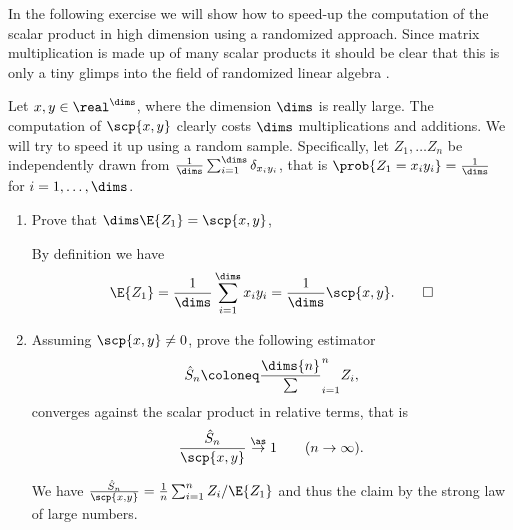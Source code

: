 In the following exercise we will show how to speed-up the computation of the
scalar product in high dimension using a randomized approach.
Since matrix multiplication is made up of many scalar products it should be
clear that this is only a tiny glimps into the field of randomized
linear algebra \citep[e.g.][]{murrayRandomizedNumericalLinear2023}.

\begin{exercise}
    Let \(x,y \in \real^\dims\), where the dimension \(\dims\) is really large.
    The computation of \(\scp{x,y}\) clearly costs \(\dims\) multiplications and
    additions. We will try to speed it up using a random sample.
    Specifically, let \(Z_1, \ldots Z_n\) be independently drawn from
    \(\frac1\dims\sum_{i=1}^\dims \delta_{x_iy_i}\), that is
    \(\prob{Z_1 = x_iy_i} = \frac1\dims\) for \(i=1, \ldots, \dims\).
    \begin{enumerate}[label=(\alph*), noitemsep]
        \item Prove that \(\dims \E{Z_1} = \scp{x,y}\),
        \begin{solution}
            By definition we have
            \[
                \E{Z_1} = \frac1\dims\sum_{i=1}^\dims  x_i y_i = \frac1\dims \scp{x,y}.
                \qedhere
            \]            
        \end{solution}

        \item Assuming \(\scp{x,y} \neq 0\), prove the following estimator
        \[
            \hat S_n \coloneq \frac\dims{n} \sum_{i=1}^n Z_i,
        \]
        converges against the scalar product in relative terms, that is
        \[
            \frac{\hat S_n}{\scp{x,y}} \overset\as\to 1 \qquad (n \to \infty).
        \]
        \begin{solution}
            We have \(\frac{\hat S_n}{\scp{x,y}} = \frac1n \sum_{i=1}^n Z_i /
            \E{Z_1}\) and thus the claim by the strong law of large numbers.
        \end{solution}


\end{enumerate}
\end{exercise}
